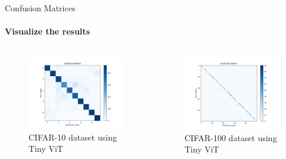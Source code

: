 \begin{frame}[fragile]{Confusion Matrices}
  \framesubtitle{Visualize the results}
  \begin{columns}
    \begin{column}{0.3\textwidth}
      \begin{figure}[!ht]
        \includegraphics[width=\textwidth]{images/cifar10_cm.png}
        \small CIFAR-10 dataset using Tiny ViT
      \end{figure}
    \end{column}

    \begin{column}{0.3\textwidth}
      \begin{figure}[!ht]
        \includegraphics[width=\textwidth]{images/cifar100_cm.png}
        \small CIFAR-100 dataset using Tiny ViT
      \end{figure}
    \end{column}


\end{columns}
\end{frame}
